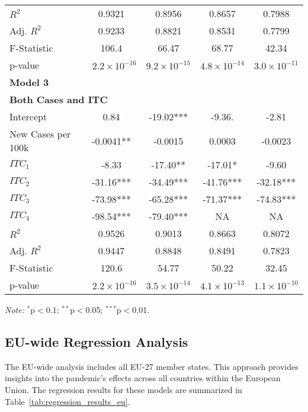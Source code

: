 \documentclass[12pt,onehalfspacing,headsepline,oneside,openright,a4paper, fleqn]{report}
\begin{document}
\begin{table}[H]
\begin{adjustbox}{width=\textwidth}
\begin{tabular}{lcccc}
$R^2$               & 0.9321    & 0.8956    & 0.8657    & 0.7988    \\
Adj. $R^2$          & 0.9233    & 0.8821    & 0.8531    & 0.7799    \\
F-Statistic         & 106.4     & 66.47     & 68.77     & 42.34     \\
p-value             & $~~~  2.2 \times 10^{-16}$ & $9.2 \times 10^{-15}$ & $4.8 \times 10^{-14}$ & $3.0 \times 10^{-11}$ \\
\midrule
\multicolumn{5}{l}{\textbf{\normalsize Model 3}} \\
\multicolumn{5}{l}{\textbf{Both Cases and ITC}} \\
Intercept           & 0.84      & -19.02*** & -9.36.    & -2.81     \\
New Cases per 100k  & -0.0041** & -0.0015   & 0.0003    & -0.0023   \\
$ITC_1$              & -8.33     & -17.40**  & -17.01*   & -9.60     \\
$ITC_2$              & -31.16*** & -34.49*** & -41.76*** & -32.18*** \\
$ITC_3$              & -73.98*** & -65.28*** & -71.37*** & -74.83*** \\
$ITC_4$              & -98.54*** & -79.40*** & NA        & NA        \\
$R^2$               & 0.9526    & 0.9013    & 0.8663    & 0.8072    \\
Adj. $R^2$          & 0.9447    & 0.8848    & 0.8491    & 0.7823    \\
F-Statistic         & 120.6     & 54.77     & 50.22     & 32.45     \\
p-value             & $~~~ 2.2 \times 10^{-16}$ & $3.5 \times 10^{-14}$ & $4.1 \times 10^{-13}$ & $1.1 \times 10^{-10}$ \\
\bottomrule
\end{tabular}
\end{adjustbox}
\renewcommand{\arraystretch}{1} 
\vspace{0.5em} 
\newline
\footnotesize \textit{Note:} $^{*}$p$<$0.1; $^{**}$p$<$0.05; $^{***}$p$<$0.01.
\end{table}


\subsection*{EU-wide Regression Analysis}


The EU-wide analysis includes all EU-27 member states. This approach provides insights into the pandemic's effects across all countries within the European Union. The regression results for these models are summarized in Table~\ref{tab:regression_results_eu}.
\end{document}
